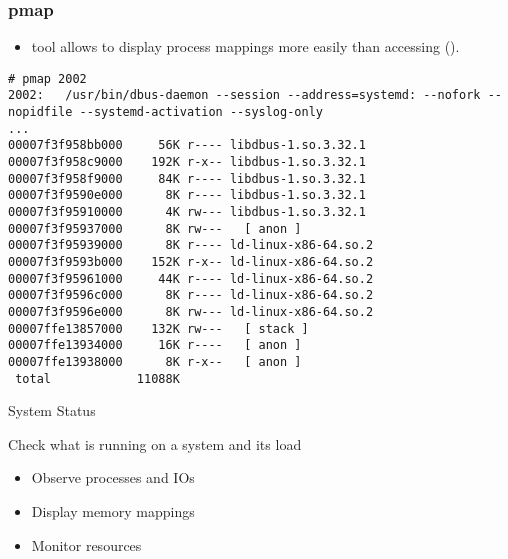 \begin{frame}[fragile]
  \frametitle{pmap}
  \begin{itemize}
    \item {} tool allows to display process mappings more easily than
          accessing  ().
  \end{itemize}
  \begin{block}{}
    \begin{verbatim}
# pmap 2002
2002:   /usr/bin/dbus-daemon --session --address=systemd: --nofork --nopidfile --systemd-activation --syslog-only
...
00007f3f958bb000     56K r---- libdbus-1.so.3.32.1
00007f3f958c9000    192K r-x-- libdbus-1.so.3.32.1
00007f3f958f9000     84K r---- libdbus-1.so.3.32.1
00007f3f9590e000      8K r---- libdbus-1.so.3.32.1
00007f3f95910000      4K rw--- libdbus-1.so.3.32.1
00007f3f95937000      8K rw---   [ anon ]
00007f3f95939000      8K r---- ld-linux-x86-64.so.2
00007f3f9593b000    152K r-x-- ld-linux-x86-64.so.2
00007f3f95961000     44K r---- ld-linux-x86-64.so.2
00007f3f9596c000      8K r---- ld-linux-x86-64.so.2
00007f3f9596e000      8K rw--- ld-linux-x86-64.so.2
00007ffe13857000    132K rw---   [ stack ]
00007ffe13934000     16K r----   [ anon ]
00007ffe13938000      8K r-x--   [ anon ]
 total            11088K
    \end{verbatim}
  \end{block}
\end{frame}

\setuplabframe
{System Status}
{
  Check what is running on a system and its load
  \begin{itemize}
    \item Observe processes and IOs
    \item Display memory mappings
    \item Monitor resources
  \end{itemize}
}